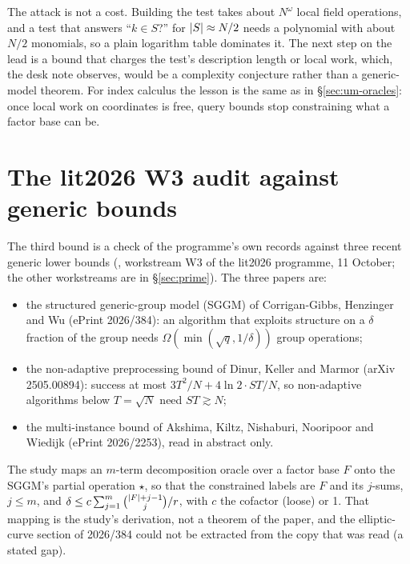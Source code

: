 The attack is not a cost. Building the test takes about $N^\omega$ local
field operations, and a test that answers ``$k\in S$?'' for $\lvert S \rvert\approx N/2$
needs a polynomial with about $N/2$ monomials, so a plain logarithm table
dominates it. The next step on the lead is a bound that charges the test's
description length or local work, which, the desk note observes, would be a
complexity conjecture rather than a generic-model theorem. For index
calculus the lesson is the same as in \S\ref{sec:um-oracles}: once local work
on coordinates is free, query bounds stop constraining what a factor base
can be.

\section{The lit2026 W3 audit against generic bounds}\label{sec:um-w3}

The third bound is a check of the programme's own records against three
recent generic lower bounds (,
workstream W3 of the lit2026 programme, 11 October; the other workstreams
are in \S\ref{sec:prime}). The three papers are:
\begin{itemize}
\item the structured generic-group model (SGGM) of Corrigan-Gibbs, Henzinger
  and Wu (ePrint 2026/384): an algorithm that exploits structure on a
  $\delta$ fraction of the group needs $\Omega(\min(\sqrt q,1/\delta))$ group
  operations;
\item the non-adaptive preprocessing bound of Dinur, Keller and Marmor
  (arXiv 2505.00894): success at most $3T^2/N+4\ln2\cdot ST/N$, so
  non-adaptive algorithms below $T=\sqrt N$ need $ST\gtrsim N$;
\item the multi-instance bound of Akshima, Kiltz, Nishaburi, Nooripoor and
  Wiedijk (ePrint 2026/2253), read in abstract only.
\end{itemize}
The study maps an $m$-term decomposition oracle over a factor base $F$ onto
the SGGM's partial operation $\star$, so that the constrained labels are $F$
and its $j$-sums, $j\le m$, and
$\delta\le c\sum_{j=1}^m\binom{\lvert F \rvert+j-1}j/r$, with $c$ the cofactor (loose) or
1. That mapping is the study's derivation, not a theorem of the paper, and
the elliptic-curve section of 2026/384 could not be extracted from the copy
that was read (a stated gap).


